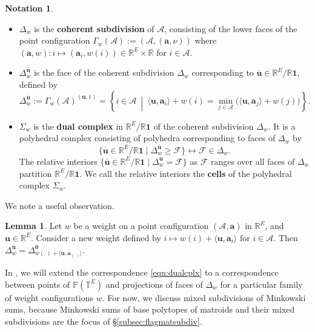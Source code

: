 \documentclass[11pt]{amsart}
\newcommand{\RR}{\mathbb R}
\newcommand{\PP}{\mathbb P}
\newcommand{\TT}{\mathbb T}
\newcommand{\bu}{{\mathbf u}}
\theoremstyle{definition}
\newtheorem{lem}[thm]{Lemma}
\newtheorem{notation}[thm]{Notation}
\begin{document}
\begin{notation}
\label{notation:weights}
\hfill
\begin{itemize}
\item $\Delta_w$ is the \textbf{coherent subdivision} of $\mathcal A$, consisting of the lower faces of the point configuration $\Gamma_w(\mathcal A) := (\mathcal A, (\mathbf a, \nu))$ where $(\mathbf a, w): i \mapsto (\mathbf a_i, w(i))\in \RR^E\times \RR$ for $i\in \mathcal A$.
\item $\Delta^{\overline\bu}_w$ is the face of the coherent subdivision $\Delta_w$ corresponding to ${\overline\bu} \in \RR^E/\RR\mathbf 1$, defined by
\[
\Delta_w^{\overline\bu} := \Gamma_w(\mathcal A)^{({\bu},1)} = \left \{i\in \mathcal A\  \middle  | \   \langle {\bu}, \mathbf a_i \rangle +w(i) = \min_{j\in \mathcal A}\Big( \langle {\bu},\mathbf a_j \rangle +w(j)  \Big) \right\}.
\]
\item $\Sigma_w$ is the \textbf{dual complex} in $\RR^E/\RR\mathbf 1$ of the coherent subdivision $\Delta_w$.  It is a polyhedral complex consisting of polyhedra corresponding to faces of $\Delta_w$ by
\begin{equation}\label{eqn:dualcplx}\tag{\textdagger}
\{ {\overline\bu} \in \RR^E/\RR\mathbf 1 \mid \Delta_w^{\overline\bu} \geq \mathcal F\} \longleftrightarrow \mathcal F \in \Delta_w.
\end{equation}
The relative interiors $\{{\overline\bu} \in \RR^E/\RR\mathbf 1 \mid \Delta_w^{\overline\bu} = \mathcal F\}$ as $\mathcal F$ ranges over all faces of $\Delta_w$ partition $\RR^E/\RR\mathbf 1$.  We call the relative interiors the \textbf{cells} of the polyhedral complex $\Sigma_w$. 
\end{itemize}
\end{notation}

We note a useful observation.%

\begin{lem}\label{lem:linearshift}
Let $w$ be a weight on a point configuration $(\mathcal A,\mathbf a)$ in $\RR^E$, and ${\bu} \in \RR^E$.  Consider a new weight defined by $i \mapsto w(i) + \langle \bu , \mathbf a_{i}\rangle$ for $i\in \mathcal A$.  Then $\Delta_w^{\overline\bu} = \Delta_{w(\cdot) + \langle {\bu},  \mathbf a_{(\cdot)}\rangle}^{\mathbf 0}$.
\end{lem}

In , we will extend the correspondence \eqref{eqn:dualcplx} to a correspondence between points of $\PP(\TT^E)$ and projections of faces of $\Delta_w$ for a particular family of weight configurations $w$.  For now, we discuss mixed subdivisions of Minkowski sums,   because Minkowski sums of base polytopes of matroids and their mixed subdivisions are the focus of \S\ref{subsec:flagmatsubdiv}.
\end{document}

